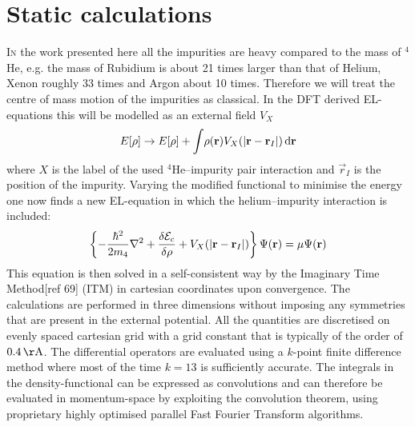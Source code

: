 	\section{Static calculations}
		\lettrine[lines=3,findent=3pt,nindent=0pt]{I}{n} the work presented here all the impurities are heavy compared to the mass of $^4$He, e.g. the mass of Rubidium is about 21 times larger than that of Helium, Xenon roughly 33 times and Argon about 10 times. Therefore we will treat the centre of mass motion of the impurities as classical. In the DFT derived EL-equations this will be modelled as an external field $V_X$
		\begin{align}
			E[\rho] \rightarrow E[\rho] +  \int\!\rho({\mathbf r}) V_X\qty(\abs{{\mathbf r} - {\mathbf r}_I})\,\mathrm{d}{\bm{\mathrm{r}}} \label{eq:el-static-hi}
		\end{align}
		where $X$ is the label of the used $^4$He--impurity pair interaction and ${\vec r}_I$ is the position of the impurity. Varying the modified functional to minimise the energy one now finds a new EL-equation in which the helium--impurity interaction is included:
		\begin{align}
			\left\{-\frac{\hbar^2}{2m_4} \laplacian + \fdv{\mathcal{E}_c}{\rho} + V_X(|{\mathbf r} - {\mathbf r_I}|)\right\}\Psi({\mathbf r}) = \mu \Psi({\mathbf r}) \label{eq:el-static-hi}
		\end{align}
		This equation is then solved in a self-consistent way by the Imaginary Time Method[ref 69] (ITM) in cartesian coordinates upon convergence. The calculations are performed in three dimensions without imposing any symmetries that are present in the external potential. All the quantities are discretised on evenly spaced cartesian grid with a grid constant that is typically of the order of $0.4\unit{\AA}$. The differential operators are evaluated using a $k$-point finite difference method where most of the time $k=13$ is sufficiently accurate. The integrals in the density-functional can be expressed as convolutions and can therefore be evaluated in momentum-space by exploiting the convolution theorem, using proprietary highly optimised parallel Fast Fourier Transform algorithms. 
			
